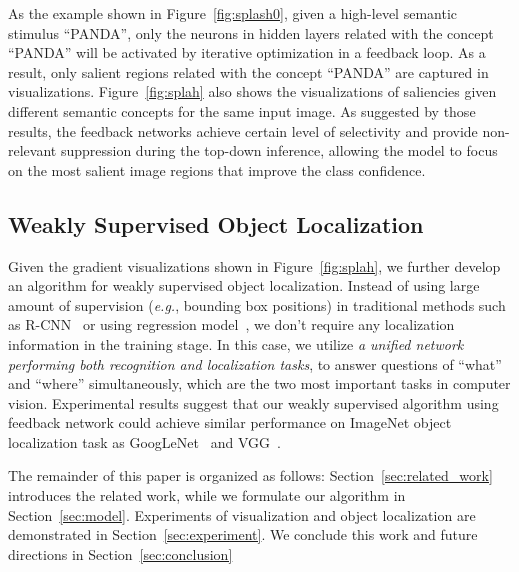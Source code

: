 As the example shown in Figure~\ref{fig:splash0}, given a high-level semantic stimulus ``PANDA'', only the neurons in hidden layers related with the concept ``PANDA'' will be activated by iterative optimization in a feedback loop. As a result, only salient regions related with the concept ``PANDA'' are captured in visualizations. Figure~\ref{fig:splah} also shows the visualizations of saliencies given different semantic concepts for the same input image. As suggested by those results, the feedback networks achieve certain level of selectivity and provide non-relevant suppression during the top-down inference, allowing the model to focus on the most salient image regions that improve the class confidence. 


\subsection{Weakly Supervised Object Localization}
Given the gradient visualizations shown in Figure~\ref{fig:splah}, we further develop an algorithm for weakly supervised object localization. Instead of using large amount of supervision (\emph{e.g.}, bounding box positions) in traditional methods such as R-CNN~\cite{girshick2014rich} or using regression model~\cite{erhan2014scalable, Simonyan2014Very}, we don't require any localization information in the training stage. In this case, we utilize \emph{a unified network performing both recognition and localization tasks}, to answer questions of ``what'' and ``where'' simultaneously, which are the two most important tasks in computer vision. Experimental results suggest that our weakly supervised algorithm using feedback network could achieve similar performance on ImageNet object localization task as GoogLeNet~\cite{Szegedy2014Going} and VGG~\cite{Simonyan2014Very}.

The remainder of this paper is organized as follows: Section~\ref{sec:related_work} introduces the related work, while we formulate our algorithm in Section~\ref{sec:model}. Experiments of visualization and object localization are demonstrated in Section~\ref{sec:experiment}. We conclude this work and future directions in Section~\ref{sec:conclusion}

